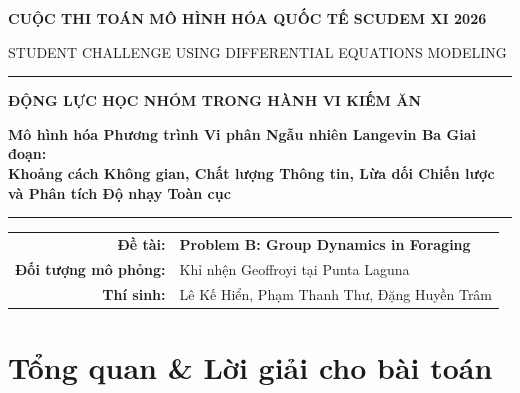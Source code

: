 \documentclass[11pt,a4paper]{report}
\newcommand{\mytitle}{ĐỘNG LỰC HỌC NHÓM TRONG HÀNH VI KIẾM ĂN}
\newcommand{\mysubtitle}{Mô hình hóa Phương trình Vi phân Ngẫu nhiên Langevin Ba Giai đoạn:\\Khoảng cách Không gian, Chất lượng Thông tin, Lừa dối Chiến lược và Phân tích Độ nhạy Toàn cục}
\begin{document}
\begin{titlepage}
\thispagestyle{empty}
\begin{center}
  \vspace*{0.8cm}
  {\small\bfseries\color{accent}CUỘC THI TOÁN MÔ HÌNH HÓA QUỐC TẾ SCUDEM XI 2026\par}
  \vspace{0.3cm}
  {\footnotesize\color{black!60}STUDENT CHALLENGE USING DIFFERENTIAL EQUATIONS MODELING\par}
  \vspace{1.2cm}
  \rule{0.88\textwidth}{1.2pt}\par
  \vspace{0.7cm}
  {\huge\bfseries\color{accent} \mytitle\par}
  \vspace{0.5cm}
  {\large\color{subaccent}\textbf{\mysubtitle}\par}
  \vspace{0.7cm}
  \rule{0.88\textwidth}{1.2pt}\par
  \vspace{1.0cm}

  \begin{tabularx}{0.92\textwidth}{@{}rX@{}}
    \textbf{Đề tài:} & \textbf{Problem B: Group Dynamics in Foraging} \\
    \textbf{Đối tượng mô phỏng:} & Khỉ nhện Geoffroyi tại Punta Laguna \\
    \textbf{Thí sinh:} & Lê Kế Hiển, Phạm Thanh Thư, Đặng Huyền Trâm \\
  \end{tabularx}

  \vfill
\end{center}
\end{titlepage}

\chapter*{Tổng quan \& Lời giải cho bài toán}
\end{document}

